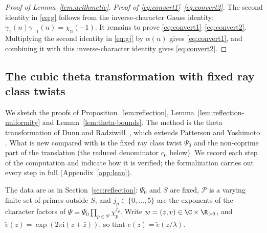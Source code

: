 \begin{proof}[Proof of Lemma~\ref{lem:arithmetic}]
\par\noindent\textit{Proof of \eqref{eq:convert1}--\eqref{eq:convert2}.}\quad
The second identity in \eqref{eq:g} follows from the inverse-character
Gauss identity:
$\gamma_1(n)\gamma_{-1}(n)=\chi_n(-1)$.
It remains to prove \eqref{eq:convert1}--\eqref{eq:convert2}.
Multiplying the second identity in \eqref{eq:gj} by
$\overline{\alpha(n)}$ gives \eqref{eq:convert1}, and combining it
with this inverse-character identity gives \eqref{eq:convert2}.
\end{proof}

\subsection{The cubic theta transformation with fixed ray class twists}\label{app:fixed-ray}

We sketch the proofs of Proposition~\ref{lem:reflection}, Lemma~\ref{lem:reflection-uniformity}
and Lemma~\ref{lem:theta-bounds}. The method is the theta transformation of Dunn and
Radziwi\l\l\ \cite[\S5 and Appendix~A]{DR}, which extends Patterson \cite{Pat77} and Yoshimoto
\cite{Yos87}. What is new compared with \cite{DR} is the fixed ray class twist $\Psi_0$ and the
non-coprime part of the translation (the reduced denominator $c_0$ below). We record each step
of the computation and indicate how it is verified; the formalization carries out every step
in full (Appendix~\ref{app:lean}).

The data are as in Section~\ref{sec:reflection}: $\Psi_0$ and $S$ are fixed, $\mathcal P$ is a
varying finite set of primes outside $S$, and $j_p\in\{0,\dots,5\}$ are the exponents of the
character factors of $\Psi=\Psi_0\prod_{p\in\mathcal P}\chi_p^{j_p}$. Write
$w=(z,v)\in\C\times\R_{>0}$, and $\breve e(z)=\exp(2\pi\mathrm i(z+\bar z))$, so that
$e(z)=\breve e(z/\lambda)$.

